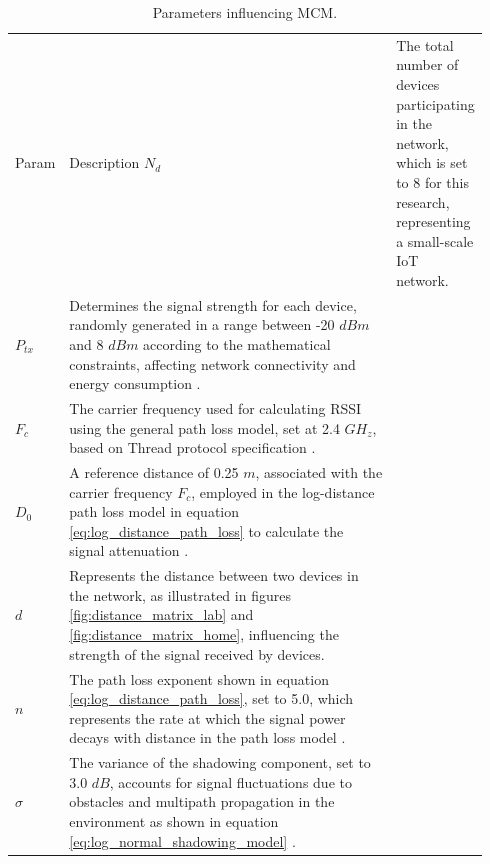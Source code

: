 \begin{longtable}{>{\hspace{0pt}}m{0.098\linewidth}>{\hspace{0pt}}m{0.842\linewidth}}
    \label{tab:monte_carlo_parameters}\\
    \caption{Parameters influencing \acrlong{MCM}.}\\
    \hline\hline
    Param & Description
    \endfirsthead
    \hline
    $N_d$     & The total number of devices participating in the network, which is set to 8 for this research, representing a small-scale \gls{IoT} network.                                                                                                             \\
    \hline
    $P_{tx}$  & Determines the signal strength for each device, randomly generated in a range between -20 $dBm$ and 8 $dBm$ according to the mathematical constraints, affecting network connectivity and energy consumption \cite{semiconductor_nrf52840_2018_1}.       \\
    \hline
    $F_c$     & The carrier frequency used for calculating \gls{RSSI} using the general path loss model, set at 2.4 ${GH}_z$, based on Thread protocol specification \cite{Thread_Group_Fundamentals}.                                                                   \\
    \hline
    $D_0$     & A reference distance of 0.25 $m$, associated with the carrier frequency $F_c$, employed in the log-distance path loss model in equation \ref{eq:log_distance_path_loss} to calculate the signal attenuation \cite{cho2010mimo}.                          \\
    \hline
    $d$       & Represents the distance between two devices in the network, as illustrated in figures \ref{fig:distance_matrix_lab} and \ref{fig:distance_matrix_home}, influencing the strength of the signal received by devices.                                      \\
    \hline
    $n$       & The path loss exponent shown in equation \ref{eq:log_distance_path_loss}, set to 5.0, which represents the rate at which the signal power decays with distance in the path loss model \cite{cho2010mimo}.                                                \\
    \hline
    $\sigma$  & The variance of the shadowing component, set to 3.0 $dB$, accounts for signal fluctuations due to obstacles and multipath propagation in the environment as shown in equation \ref{eq:log_normal_shadowing_model} \cite{cho2010mimo}.                    \\

\end{longtable}
